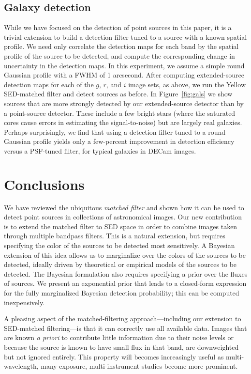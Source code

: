 \documentclass[11pt,letterpaper,linenumbers]{aastex63}
\newcommand{\figref}[1]{\mbox{Figure~\ref{#1}}}
\begin{document}
\subsection{Galaxy detection}


While we have focused on the detection of point sources in this paper,
it is a trivial extension to build a detection filter tuned to a
source with a known spatial profile.  We need only correlate the
detection maps for each band by the spatial profile of the source to
be detected, and compute the corresponding change in uncertainty in
the detection maps.  In this experiment, we assume a simple round
Gaussian profile with a FWHM of 1 arcsecond.  After computing
extended-source detection maps for each of the $g$, $r$, and $i$ image
sets, as above, we run the Yellow SED-matched filter and detect
sources as before.  In \figref{fig:gals} we show sources that are more
strongly detected by our extended-source detector than by a
point-source detector.  These include a few bright stars (where the
saturated cores cause errors in estimating the signal-to-noise) but
are largely real galaxies.  Perhaps surprisingly, we find that using a
detection filter tuned to a round Gaussian profile yields only a
few-percent improvement in detection efficiency versus a PSF-tuned
filter, for typical galaxies in DECam images.


\section{Conclusions}

We have reviewed the ubiquitous \emph{matched filter} and shown how it
can be used to detect point sources in collections of astronomical
images.  Our new contribution is to extend the matched filter to SED
space in order to combine images taken through multiple bandpass
filters.  This is a natural extension, but requires specifying the
color of the sources to be detected most sensitively.  A Bayesian
extension of this idea allows us to marginalize over the colors of the
sources to be detected, ideally driven by theoretical or empirical
models of the sources to be detected.  The Bayesian formulation also
requires specifying a prior over the fluxes of sources.  We present an
exponential prior that leads to a closed-form expression for the fully
marginalized Bayesian detection probability; this can be computed
inexpensively.


A pleasing aspect of the matched-filtering approach---including our
extension to SED-matched filtering---is that it can correctly use all
available data.  Images that are known \emph{a priori} to contribute
little information due to their noise levels or because the source is
known to have small flux in that band, are downweighted but not
ignored entirely.  This property will becomes increasingly useful as
multi-wavelength, many-exposure, multi-instrument studies become more
prominent.
\end{document}
